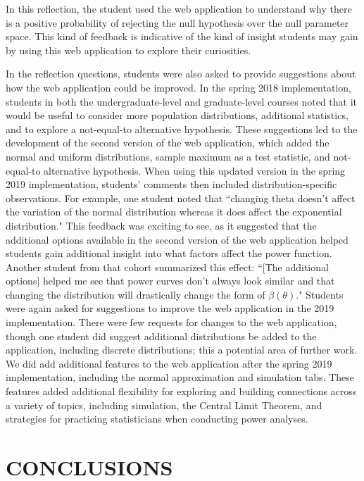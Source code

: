 \documentclass{TISE}
\begin{document}
In this reflection, the student used the web application to understand why there is a positive probability of rejecting the null hypothesis over the null parameter space. This kind of feedback is indicative of the kind of insight students may gain by using this web application to explore their curiosities.

In the reflection questions, students were also asked to provide suggestions about how the web application could be improved. In the spring 2018 implementation, students in both the undergraduate-level and graduate-level courses noted that it would be useful to consider more population distributions, additional statistics, and to explore a not-equal-to alternative hypothesis. These suggestions led to the development of the second version of the web application, which added the normal and uniform distributions, sample maximum as a test statistic, and not-equal-to alternative hypothesis. When using this updated version in the spring 2019 implementation, students' comments then included distribution-specific observations. For example, one student noted that ``changing theta doesn't affect the variation of the normal distribution whereas it does affect the exponential distribution." This feedback was exciting to see, as it suggested that the additional options available in the second version of the web application helped students gain additional insight into what factors affect the power function. Another student from that cohort summarized this effect: ``[The additional options] helped me see that power curves don't always look similar and that changing the distribution will drastically change the form of $\beta(\theta)$." Students were again asked for suggestions to improve the web application in the 2019 implementation. There were few requests for changes to the web application, though one student did suggest additional distributions be added to the application, including discrete distributions; this a potential area of further work. We did add additional features to the web application after the spring 2019 implementation, including the normal approximation and simulation tabs. These features added additional flexibility for exploring and building connections across a variety of topics, including simulation, the Central Limit Theorem, and strategies for practicing statisticians when conducting power analyses. 

\section{CONCLUSIONS}
\end{document}
